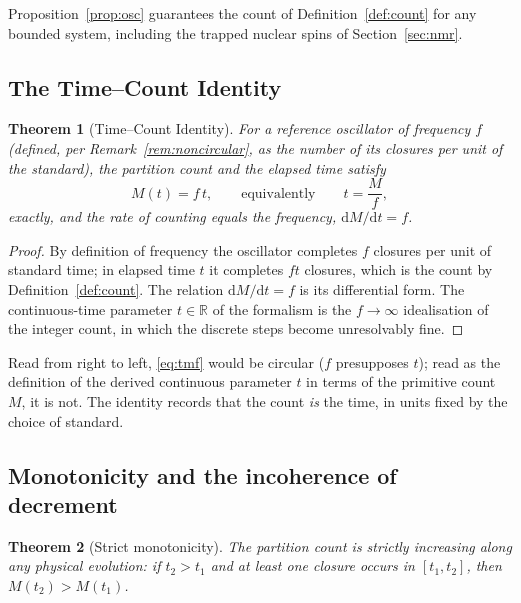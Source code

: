 \documentclass[11pt,a4paper]{article}
\theoremstyle{thmstyle}
\newtheorem{theorem}{Theorem}[section]
\theoremstyle{definition}
\theoremstyle{remark}
\newcommand{\R}{\mathbb{R}}
\newcommand{\Count}{M}
\begin{document}
Proposition~\ref{prop:osc} guarantees the count of
Definition~\ref{def:count} for any bounded system, including the trapped
nuclear spins of Section~\ref{sec:nmr}.

\subsection{The Time--Count Identity}
\label{sec:time-count}

\begin{theorem}[Time--Count Identity]
\label{thm:time-count}
For a reference oscillator of frequency $f$ (defined, per
Remark~\ref{rem:noncircular}, as the number of its closures per unit of
the standard), the partition count and the elapsed time satisfy
\begin{equation}
\Count(t)=f\,t,\qquad\text{equivalently}\qquad t=\frac{\Count}{f},
\label{eq:tmf}
\end{equation}
exactly, and the rate of counting equals the frequency,
$\mathrm{d}\Count/\mathrm{d}t=f$.
\end{theorem}

\begin{proof}
By definition of frequency the oscillator completes $f$ closures per unit
of standard time; in elapsed time $t$ it completes $ft$ closures, which
is the count by Definition~\ref{def:count}. The relation
$\mathrm{d}\Count/\mathrm{d}t=f$ is its differential form. The
continuous-time parameter $t\in\R$ of the formalism is the
$f\to\infty$ idealisation of the integer count, in which the discrete
steps become unresolvably fine.
\end{proof}

Read from right to left, \eqref{eq:tmf} would be circular ($f$
presupposes $t$); read as the definition of the derived continuous
parameter $t$ in terms of the primitive count $\Count$, it is not. The
identity records that the count \emph{is} the time, in units fixed by the
choice of standard.

\subsection{Monotonicity and the incoherence of decrement}
\label{sec:monotone}

\begin{theorem}[Strict monotonicity]
\label{thm:monotone}
The partition count is strictly increasing along any physical evolution:
if $t_{2}>t_{1}$ and at least one closure occurs in $[t_{1},t_{2}]$, then
$\Count(t_{2})>\Count(t_{1})$.
\end{theorem}
\end{document}
